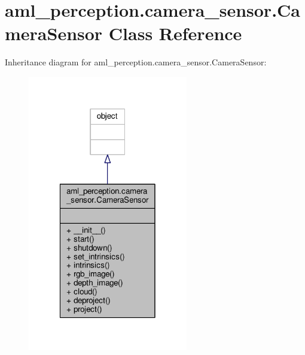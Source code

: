 \hypertarget{classaml__perception_1_1camera__sensor_1_1_camera_sensor}{\section{aml\-\_\-perception.\-camera\-\_\-sensor.\-Camera\-Sensor Class Reference}
\label{classaml__perception_1_1camera__sensor_1_1_camera_sensor}
}


Inheritance diagram for aml\-\_\-perception.\-camera\-\_\-sensor.\-Camera\-Sensor\-:
\nopagebreak
\begin{figure}[H]
\begin{center}
\leavevmode
\includegraphics[width=198pt]{classaml__perception_1_1camera__sensor_1_1_camera_sensor__inherit__graph}
\end{center}
\end{figure}


